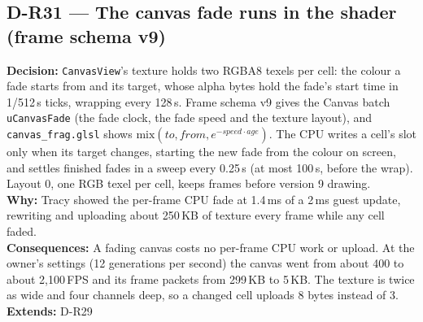 \subsection*{D-R31 --- The canvas fade runs in the shader (frame schema v9)}
\begin{decisionbox}[title={D-R31 \quad 2026-09-28}]
\textbf{Decision:} \texttt{CanvasView}'s texture holds two RGBA8 texels per
cell: the colour a fade starts from and its target, whose alpha bytes hold
the fade's start time in 1/512\,s ticks, wrapping every 128\,s. Frame schema
v9 gives the Canvas batch \texttt{uCanvasFade} (the fade clock, the fade speed
and the texture layout), and \texttt{canvas\_frag.glsl} shows
$\mathrm{mix}(\mathit{to}, \mathit{from}, e^{-\mathit{speed} \cdot
\mathit{age}})$. The CPU writes a cell's slot only when its target changes,
starting the new fade from the colour on screen, and settles finished fades
in a sweep every 0.25\,s (at most 100\,s, before the wrap). Layout 0, one RGB
texel per cell, keeps frames before version 9 drawing.\\
\textbf{Why:} Tracy showed the per-frame CPU fade at 1.4\,ms of a 2\,ms guest
update, rewriting and uploading about 250\,KB of texture every frame while
any cell faded.\\
\textbf{Consequences:} A fading canvas costs no per-frame CPU work or upload.
At the owner's settings (12 generations per second) the canvas went from
about 400 to about 2,100\,FPS and its frame packets from 299\,KB to 5\,KB.
The texture is twice as wide and four channels deep, so a changed cell
uploads 8 bytes instead of 3.\\
\textbf{Extends:} D-R29
\end{decisionbox}

